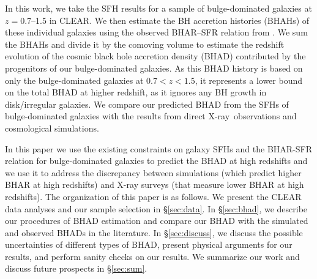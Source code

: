 \documentclass[twocolumn,twocolappendix,times]{aastex63}
\newcommand{\jwst}{{\it JWST\/}}
\newcommand{\xray}{\hbox{X-ray}}  %
\newcommand{\cjp}[2]{\textcolor{red}{#1}}
\begin{document}
\begin{CJK*}{UTF8}{gbsn}
In this work, we take the SFH results for a sample of bulge-dominated galaxies at $z=0.7$--1.5 in CLEAR.
We then estimate the BH accretion histories (BHAHs) of these individual galaxies using the observed BHAR--SFR relation from \cite{yang19}.
We sum the BHAHs and divide it by the comoving volume to estimate the redshift evolution of the cosmic black hole accretion density (BHAD) contributed by the progenitors of our bulge-dominated galaxies. 
As this BHAD history is based on only the bulge-dominated galaxies at $0.7 < z < 1.5$, it represents 
a lower bound on the total BHAD at higher redshift, as it ignores any BH growth in disk/irregular galaxies. %
We compare our predicted BHAD from the SFHs of bulge-dominated galaxies with the results from direct \xray\ observations and cosmological simulations. 

 
In this paper we use the existing constraints on galaxy SFHs and the BHAR-SFR relation for bulge-dominated galaxies to predict the BHAD at high redshifts and we use it to address the discrepancy between simulations (which predict higher BHAR at high redshifts) and X-ray surveys (that measure lower BHAR at high redshifts).     
The organization of this paper is as follows.
We present the CLEAR data analyses and our sample selection in \S\ref{sec:data}.
In \S\ref{sec:bhad}, we describe our procedures of BHAD estimation and compare 
our BHAD with the simulated and observed BHADs in the literature. 
In \S\ref{sec:discuss}, we discuss the possible uncertainties 
of different types of BHAD, present physical arguments for our results, and perform sanity checks on our results.
We summarize our work and discuss future prospects in
\S\ref{sec:sum}.


\end{CJK*}
\end{document}
